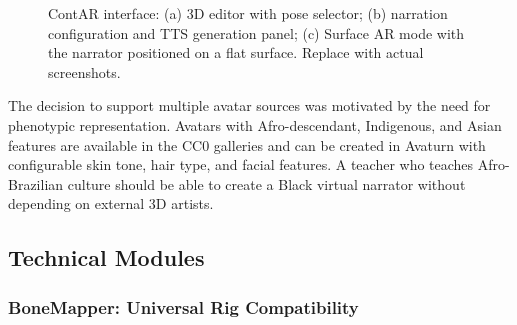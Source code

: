 \documentclass[conference]{IEEEtran}
\begin{document}
\begin{figure}[htbp]
  \centering
  \hfill
  \hfill
  \caption{ContAR interface: (a) 3D editor with pose selector; (b) narration
    configuration and TTS generation panel; (c) Surface AR mode with the
    narrator positioned on a flat surface. Replace with actual screenshots.}
  \label{fig:telas}
\end{figure}

The decision to support multiple avatar sources was motivated by the need for
phenotypic representation. Avatars with Afro-descendant, Indigenous, and Asian
features are available in the CC0 galleries and can be created in Avaturn
with configurable skin tone, hair type, and facial features. A teacher who
teaches Afro-Brazilian culture should be able to create a Black virtual
narrator without depending on external 3D artists.

\subsection{Technical Modules}

\subsubsection{BoneMapper: Universal Rig Compatibility}
\end{document}
